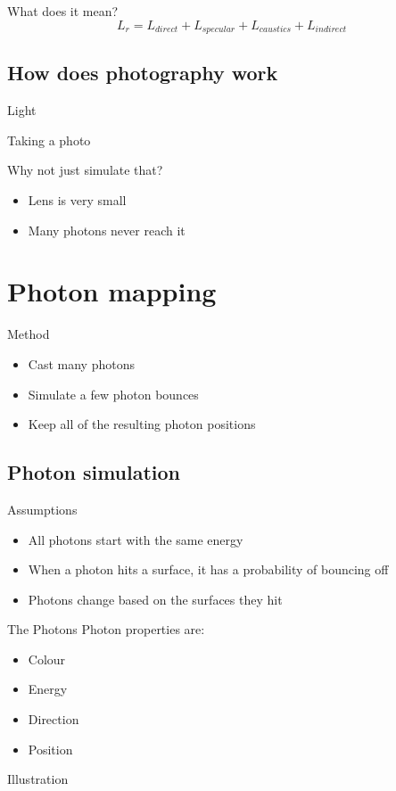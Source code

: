 \documentclass{beamer}
\begin{document}
			\begin{frame}{What does it mean?}
				\[
					L_r = L_{direct} + L_{specular} + L_{caustics} + L_{indirect}
				\]
			\end{frame}

		\subsection{How does photography work}
			\begin{frame}{Light}\end{frame}
			\begin{frame}{Taking a photo}\end{frame}
			\begin{frame}{Why not just simulate that?}
				\begin{itemize}
					\item<2-> Lens is very small
					\item<3-> Many photons never reach it
				\end{itemize}
			\end{frame}

	\section{Photon mapping}
		\begin{frame}{Method}
			\begin{itemize}
				\item<2-> Cast many photons
				\item<3-> Simulate a few photon bounces
				\item<4-> Keep all of the resulting photon positions
			\end{itemize}
		\end{frame}
		
		\subsection{Photon simulation}
			\begin{frame}{Assumptions}
				\begin{itemize}
					\item<2-> All photons start with the same energy
					\item<3-> When a photon hits a surface, it has a probability of bouncing off
					\item<4-> Photons change based on the surfaces they hit
				\end{itemize}
			\end{frame}
			\begin{frame}{The Photons}
				Photon properties are:
				\begin{itemize}
					\item<2-> Colour
					\item<3-> Energy
					\item<4-> Direction
					\item<4-> Position
				\end{itemize}
			\end{frame}
			\begin{frame}{Illustration}\end{frame}
\end{document}
